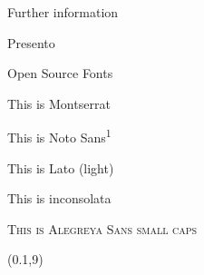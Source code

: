 \begin{frame}{Further information}
 \begin{fullpageitemize}
  \item \begin{center}\end{center}
  \item \begin{center}\end{center}
  \item \begin{center}\end{center}
 \end{fullpageitemize}
\end{frame}



\begin{frame}{Presento}
 \begin{fullpageitemize}
  \item \begin{center}\end{center}
  \item \begin{center}\end{center}
  \item \begin{center}\end{center}
 \end{fullpageitemize}
\end{frame}

\begin{frame}{Open Source Fonts}
 \begin{fullpageitemize}
  \item {\montserratfont This is Montserrat}
  \item {\notosansfont This is Noto Sans\textsuperscript{1}}
  \item {\latolightfont This is Lato (light)}
  \item {\inconsolatafont This is inconsolata}
  \item \textsc{This is Alegreya Sans small caps}
 \end{fullpageitemize}
 \begin{textblock}{11.5}(0.1,9)
 \end{textblock}
\end{frame}

